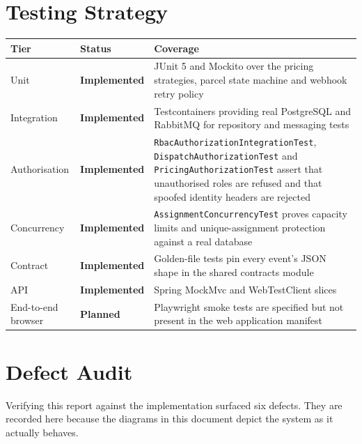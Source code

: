 \documentclass[11pt,a4paper,oneside,openany]{report}
\newcommand{\Impl}{\textbf{Implemented}}
\newcommand{\Planned}{\textbf{Planned}}
\newcommand{\code}[1]{\texttt{\small #1}}
\begin{document}
\section{Testing Strategy}
\begin{center}
\small
\begin{tabular}{@{}p{3.6cm}p{2.3cm}p{7.9cm}@{}}
\toprule
\textbf{Tier} & \textbf{Status} & \textbf{Coverage} \\
\midrule
Unit & \Impl & JUnit 5 and Mockito over the pricing strategies, parcel state machine and webhook
retry policy \\
\addlinespace
Integration & \Impl & Testcontainers providing real PostgreSQL and RabbitMQ for repository and
messaging tests \\
\addlinespace
Authorisation & \Impl & \code{RbacAuthorizationIntegrationTest},
\code{DispatchAuthorizationTest} and \code{PricingAuthorizationTest} assert that unauthorised
roles are refused and that spoofed identity headers are rejected \\
\addlinespace
Concurrency & \Impl & \code{AssignmentConcurrencyTest} proves capacity limits and unique-assignment
protection against a real database \\
\addlinespace
Contract & \Impl & Golden-file tests pin every event's JSON shape in the shared contracts module \\
\addlinespace
API & \Impl & Spring MockMvc and WebTestClient slices \\
\addlinespace
End-to-end browser & \Planned & Playwright smoke tests are specified but not present in the web
application manifest \\
\bottomrule
\end{tabular}
\label{tab:testing}
\end{center}

\section{Defect Audit}\label{sec:defects}
Verifying this report against the implementation surfaced six defects. They are recorded here
because the diagrams in this document depict the system as it actually behaves.
\end{document}
